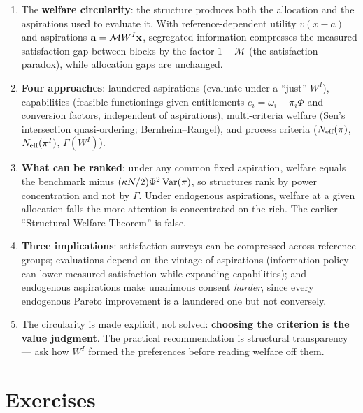 \documentclass[../structural_economics_book.tex]{subfiles}
\begin{document}
\begin{enumerate}
\item The \textbf{welfare circularity}: the structure produces both the allocation and the aspirations used to evaluate it. With reference-dependent utility $v(x - a)$ and aspirations $\mathbf{a} = \mathcal{M}W^I\mathbf{x}$, segregated information compresses the measured satisfaction gap between blocks by the factor $1 - \mathcal{M}$ (the satisfaction paradox), while allocation gaps are unchanged.

\item \textbf{Four approaches}: laundered aspirations (evaluate under a ``just'' $W^I$), capabilities (feasible functionings given entitlements $e_i = \omega_i + \pi_i\Phi$ and conversion factors, independent of aspirations), multi-criteria welfare (Sen's intersection quasi-ordering; Bernheim--Rangel), and process criteria ($N_{\text{eff}}(\pi)$, $N_{\text{eff}}(\pi^I)$, $\Gamma(W^I)$).

\item \textbf{What can be ranked}: under any common fixed aspiration, welfare equals the benchmark minus $(\kappa N/2)\Phi^2\operatorname{Var}(\pi)$, so structures rank by power concentration and not by $\Gamma$. Under endogenous aspirations, welfare at a given allocation falls the more attention is concentrated on the rich. The earlier ``Structural Welfare Theorem'' is false.

\item \textbf{Three implications}: satisfaction surveys can be compressed across reference groups; evaluations depend on the vintage of aspirations (information policy can lower measured satisfaction while expanding capabilities); and endogenous aspirations make unanimous consent \textit{harder}, since every endogenous Pareto improvement is a laundered one but not conversely.

\item The circularity is made explicit, not solved: \textbf{choosing the criterion is the value judgment}. The practical recommendation is structural transparency --- ask how $W^I$ formed the preferences before reading welfare off them.
\end{enumerate}


\section{Exercises}
\label{ch12:sec:exercises}
\end{document}
